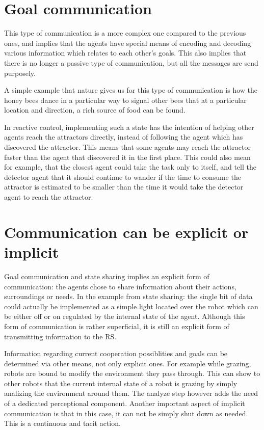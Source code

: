 \documentclass[12pt]{report}
\begin{document}
\section{Goal communication}

This type of communication is a more complex one compared to the previous ones, and implies that the agents have special means of encoding and decoding various information which relates to each other's goals. This also implies that there is no longer a passive type of communication, but all the messages are send purposely.

A simple example that nature gives us for this type of communication is how the honey bees dance in a particular way to signal other bees that at a particular location and direction, a rich source of  food can be found.

In reactive control, implementing such a state has the intention of helping other agents reach the attractors directly, instead of following the agent which has discovered the attractor. This means that some agents may reach the attractor faster than the agent that discovered it in the first place. This could also mean for example, that the closest agent could take the task only to itself, and tell the detector agent that it should continue to wander if the time to consume the attractor is estimated to be smaller than the time it would take the detector agent to reach the attractor.


\section {Communication can be explicit or implicit}

Goal communication and state sharing implies an explicit form of communication: the agents chose to share information about their actions, surroundings or needs. In the example from state sharing: the single bit of data could actually be implemented as a simple light located over the robot which can be either off or on regulated by the internal state of the agent. Although this form of communication is rather superficial, it is still an explicit form of transmitting information to the RS.

Information regarding current cooperation possiblities and goals can be determined via other means, not only explicit ones. For example while grazing, robots are bound to modify the environment they pass through. This can show to other robots that the current internal state of a robot is grazing by simply analizing the environment around them. The analyze step however adds the need of a dedicated perceptional component. Another important aspect of implicit communication is that in this case, it can not be simply shut down as needed. This is a continuous and tacit action.
\end{document}
